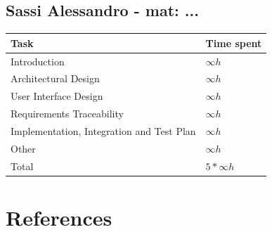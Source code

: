 \documentclass[11pt]{article}
\begin{document}
\subsection{Sassi Alessandro - mat: ...}

\begin{tabular}{|l|l|}
    \hline
    \textbf{Task} & \textbf{Time spent} \\
    \hline
    Introduction & $\infty h$ \\
    \hline
    Architectural Design & $\infty h$ \\
    \hline
    User Interface Design & $\infty h$ \\
    \hline
    Requirements Traceability & $\infty h$ \\
    \hline
    Implementation, Integration and Test Plan & $\infty h$ \\
    \hline
    Other & $\infty h$ \\
    \hline
    \hline
    Total & $5*\infty h$ \\
    \hline
\end{tabular}

\newpage

\section{References}
\end{document}

